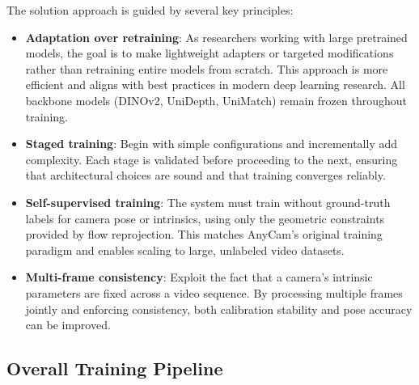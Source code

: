 The solution approach is guided by several key principles:

\begin{itemize}
    \item \textbf{Adaptation over retraining}: As researchers working with large pretrained models, the goal is to make lightweight adapters or targeted modifications rather than retraining entire models from scratch. This approach is more efficient and aligns with best practices in modern deep learning research. All backbone models (DINOv2, UniDepth, UniMatch) remain frozen throughout training.

    \item \textbf{Staged training}: Begin with simple configurations and incrementally add complexity. Each stage is validated before proceeding to the next, ensuring that architectural choices are sound and that training converges reliably.
    
    \item \textbf{Self-supervised training}: The system must train without ground-truth labels for camera pose or intrinsics, using only the geometric constraints provided by flow reprojection. This matches AnyCam's original training paradigm and enables scaling to large, unlabeled video datasets.

    \item \textbf{Multi-frame consistency}: Exploit the fact that a camera's intrinsic parameters are fixed across a video sequence. By processing multiple frames jointly and enforcing consistency, both calibration stability and pose accuracy can be improved.
\end{itemize}

\subsection{Overall Training Pipeline}

